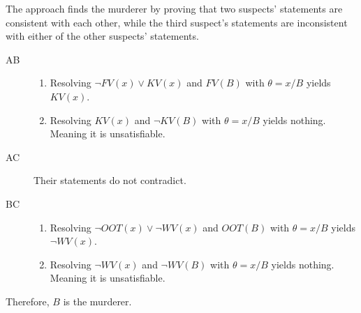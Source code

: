 \documentclass[12pt]{article}
\newenvironment{problem}[2][Problem]{\begin{trivlist}
\item[\hskip \labelsep {\bfseries #1}\hskip \labelsep {\bfseries #2.}]}{\end{trivlist}}
\begin{document}
\begin{problem}{5}
\begin{enumerate}
			\vspace{0.25cm}
			The approach finds the murderer by proving that two suspects' statements are consistent with each other,
			while the third suspect's statements are inconsistent with either of the other suspects' statements.
			\begin{description}
				\item[AB]
					\begin{enumerate}
						\item Resolving $\neg FV(x) \vee KV(x)$ and $FV(B)$ with $\theta={x/B}$ yields
							$KV(x)$.
						\item Resolving $KV(x)$ and $\neg KV(B)$ with $\theta={x/B}$ yields nothing.
							Meaning it is unsatisfiable.
					\end{enumerate}
				\item[AC]
					Their statements do not contradict.
				\item[BC]
					\begin{enumerate}
						\item Resolving $\neg OOT(x) \vee \neg WV(x)$ and $OOT(B)$ with $\theta={x/B}$
							yields $\neg WV(x)$.
						\item Resolving $\neg WV(x)$ and $\neg WV(B)$ with $\theta={x/B}$ yields nothing.
							Meaning it is unsatisfiable.
					\end{enumerate}
			\end{description}
			Therefore, $B$ is the murderer.
	\end{enumerate}
\end{problem}
\end{document}
